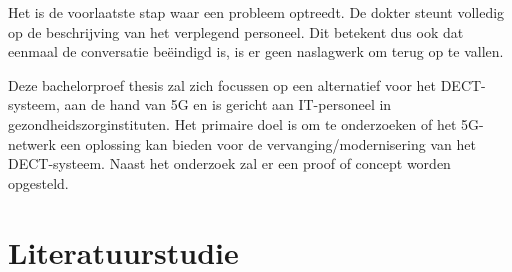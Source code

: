 Het is de voorlaatste stap waar een probleem optreedt. De dokter steunt volledig op de beschrijving van het verplegend personeel. Dit betekent dus ook dat eenmaal de conversatie beëindigd is, is er geen naslagwerk om terug op te vallen.

Deze bachelorproef thesis zal zich focussen op een alternatief voor het DECT-systeem, aan de hand van 5G en is gericht aan IT-personeel in gezondheidszorginstituten. Het primaire doel is om te onderzoeken of het 5G-netwerk een oplossing kan bieden voor de vervanging/modernisering van het DECT-systeem. Naast het onderzoek zal er een proof of concept worden opgesteld.


\section{Literatuurstudie}%
\label{sec:literatuurstudie}

